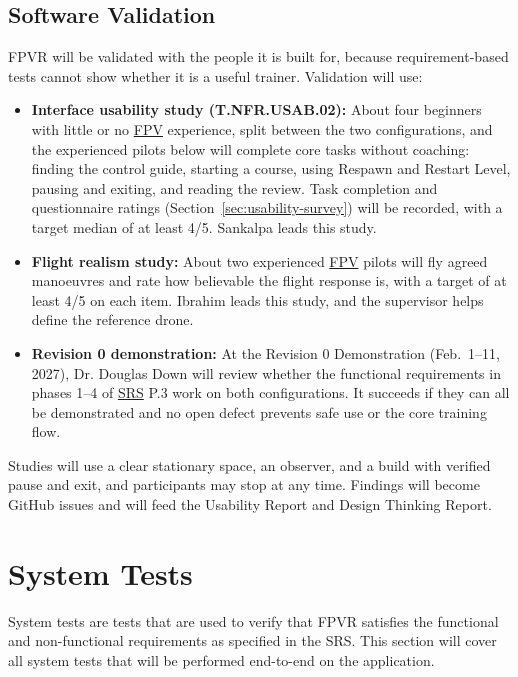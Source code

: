 \documentclass[12pt, titlepage]{article}
\begin{document}
\subsection{Software Validation}

FPVR will be validated with the people it is built for, because requirement-based tests
cannot show whether it is a useful trainer. Validation will use:

\begin{itemize}
  \item \textbf{Interface usability study (T.NFR.USAB.02):} About four beginners with little
  or no \hyperlink{abbr:FPV}{FPV} experience, split between the two configurations, and the experienced pilots
  below will complete core tasks without coaching: finding the control guide, starting a
  course, using Respawn and Restart Level, pausing and exiting, and reading the review.
  Task completion and questionnaire ratings (Section~\ref{sec:usability-survey}) will be
  recorded, with a target median of at least 4/5. Sankalpa leads this study.
  \item \textbf{Flight realism study:} About two experienced \hyperlink{abbr:FPV}{FPV} pilots will
  fly agreed manoeuvres and rate how believable the flight response is, with a target of
  at least 4/5 on each item. Ibrahim leads this study, and the supervisor helps define
  the reference drone.
  \item \textbf{Revision 0 demonstration:} At the Revision 0 Demonstration (Feb.\ 1--11,
  2027), Dr. Douglas Down will review whether the functional requirements in phases 1--4
  of \hyperlink{abbr:SRS}{SRS} P.3 work on both configurations. It succeeds if they can all be demonstrated
  and no open defect prevents safe use or the core training flow.
\end{itemize}

Studies will use a clear stationary space, an observer, and a build with verified pause
and exit, and participants may stop at any time. Findings will become GitHub issues and
will feed the Usability Report and Design Thinking Report.

\section{System Tests}

System tests are tests that are used to verify that FPVR satisfies the functional
and non-functional requirements as specified in the SRS. This section will cover all
system tests that will be performed end-to-end on the application.
\end{document}
